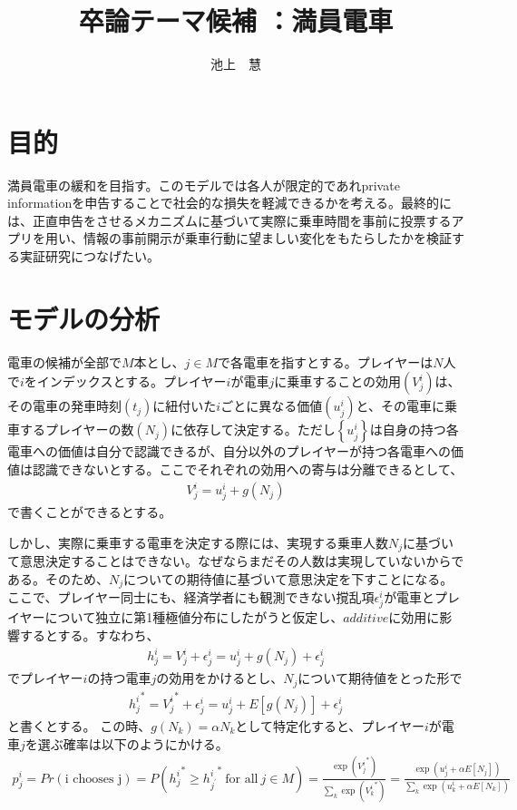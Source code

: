 \documentclass{jsarticle}
\begin{document}
\title{卒論テーマ候補 ：満員電車}
\author{池上　慧}
\maketitle

\section{目的}
満員電車の緩和を目指す。このモデルでは各人が限定的であれprivate informationを申告することで社会的な損失を軽減できるかを考える。最終的には、正直申告をさせるメカニズムに基づいて実際に乗車時間を事前に投票するアプリを用い、情報の事前開示が乗車行動に望ましい変化をもたらしたかを検証する実証研究につなげたい。

\section{モデルの分析}
電車の候補が全部で$M$本とし、$j \in M$で各電車を指すとする。プレイヤーは$N$人で$i$をインデックスとする。プレイヤー$i$が電車$j$に乗車することの効用$(V_j^i)$は、その電車の発車時刻$(t_j)$に紐付いた$i$ごとに異なる価値$(u_j^i)$と、その電車に乗車するプレイヤーの数$(N_j)$に依存して決定する。ただし$\left\{u_j^i\right\}$は自身の持つ各電車への価値は自分で認識できるが、自分以外のプレイヤーが持つ各電車への価値は認識できないとする。ここでそれぞれの効用への寄与は分離できるとして、
\begin{align*}
	V_j^i = u_j^i + g(N_j)
\end{align*}
で書くことができるとする。

しかし、実際に乗車する電車を決定する際には、実現する乗車人数$N_j$に基づいて意思決定することはできない。なぜならまだその人数は実現していないからである。そのため、$N_j$についての期待値に基づいて意思決定を下すことになる。ここで、プレイヤー同士にも、経済学者にも観測できない撹乱項$\epsilon_j^i$が電車とプレイヤーについて独立に第1種極値分布にしたがうと仮定し、$additive$に効用に影響するとする。すなわち、
\begin{align*}
	h_j^i = V_j^i + \epsilon_j^i = u_j^i + g(N_j) + \epsilon_j^i
\end{align*}
でプレイヤー$i$の持つ電車$j$の効用をかけるとし、$N_j$について期待値をとった形で
\begin{align*}
	{h_j^i}^* = {V_j^i}^* + \epsilon_j^i = u_j^i + E[g(N_j)] + \epsilon_j^i
\end{align*}
と書くとする。
この時、$g(N_k) = \alpha N_k$として特定化すると、プレイヤー$i$が電車$j$を選ぶ確率は以下のようにかける。
\begin{align*}
	p_j^i = Pr(\text{i chooses j}) = P({h_j^i}^* \geq {h_{j^{'}}^i}^*\ \text{for all}\ j \in M) = \frac{\exp({V_j^i}^*)}{\sum_k \exp({V_k^i}^*)} = \frac{\exp(u_j^i + \alpha E[N_j])}{\sum_k \exp(u_k^i + \alpha E[N_k])}
\end{align*}
\end{document}
